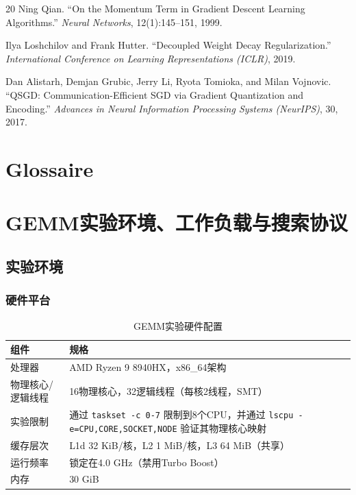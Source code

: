 \documentclass[a4paper,11pt,oneside]{article}
\begin{document}
\begin{thebibliography}{20}
Ning Qian.
``On the Momentum Term in Gradient Descent Learning Algorithms.''
\textit{Neural Networks}, 12(1):145--151, 1999.

Ilya Loshchilov and Frank Hutter.
``Decoupled Weight Decay Regularization.''
\textit{International Conference on Learning Representations (ICLR)}, 2019.

Dan Alistarh, Demjan Grubic, Jerry Li, Ryota Tomioka, and Milan Vojnovic.
``QSGD: Communication-Efficient SGD via Gradient Quantization and Encoding.''
\textit{Advances in Neural Information Processing Systems (NeurIPS)}, 30, 2017.

\end{thebibliography}

\section*{Glossaire}

\appendix

\section{GEMM实验环境、工作负载与搜索协议}\label{app:gemm_setup}

\subsection{实验环境}

\subsubsection{硬件平台}

\begin{table}[H]
\centering
\begin{tabular}{p{}p{}}
\toprule
\textbf{组件} & \textbf{规格} \\
\midrule
处理器 & AMD Ryzen 9 8940HX，x86\_64架构 \\
物理核心/逻辑线程 & 16物理核心，32逻辑线程（每核2线程，SMT）\\
实验限制 & 通过 \texttt{taskset -c 0-7} 限制到8个CPU，并通过 \texttt{lscpu -e=CPU,CORE,SOCKET,NODE} 验证其物理核心映射 \\
缓存层次 & L1d 32 KiB/核，L2 1 MiB/核，L3 64 MiB（共享）\\
运行频率 & 锁定在4.0 GHz（禁用Turbo Boost）\\
内存 & 30 GiB \\
\bottomrule
\end{tabular}
\caption{GEMM实验硬件配置}
\label{tab:gemm_hardware}
\end{table}
\end{document}
